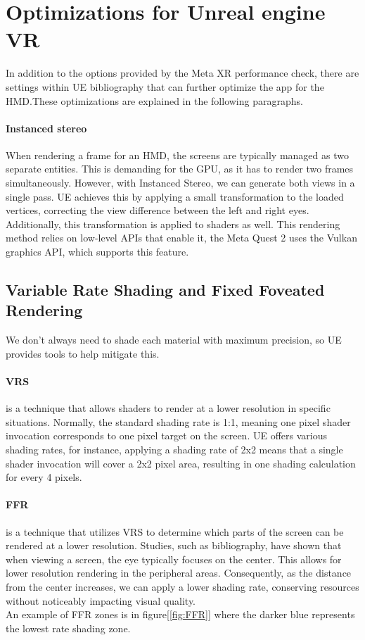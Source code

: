 \section{Optimizations for Unreal engine VR}
\noindent
In addition to the options provided by the Meta XR performance check, there are settings within \ac{UE} bibliography\cite{UEperformance} that can further optimize the app for the \ac{HMD}.These optimizations are explained in the following paragraphs.

\paragraph{Instanced stereo}
When rendering a frame for an \ac{HMD}, the screens are typically managed as two separate entities. This is demanding for the GPU, as it has to render two frames simultaneously.
However, with Instanced Stereo, we can generate both views in a single pass. \ac{UE} achieves this by applying a small transformation to the loaded vertices, correcting the view difference between the left and right eyes. Additionally, this transformation is applied to shaders as well.
This rendering method relies on low-level \ac{API}s that enable it, the Meta Quest 2 uses the Vulkan graphics \ac{API}, which supports this feature.

\subsection{Variable Rate Shading and Fixed Foveated Rendering}
\noindent
We don't always need to shade each material with maximum precision, so \ac{UE} provides tools to help mitigate this.

\paragraph{\ac{VRS}}
is a technique that allows shaders to render at a lower resolution in specific situations.
Normally, the standard shading rate is 1:1, meaning one pixel shader invocation corresponds to one pixel target on the screen.
\ac{UE} offers various shading rates, for instance, applying a shading rate of 2x2 means that a single shader invocation will cover a 2x2 pixel area, resulting in one shading calculation for every 4 pixels.

\paragraph{\ac{FFR}}
is a technique that utilizes \ac{VRS} to determine which parts of the screen can be rendered at a lower resolution.
Studies, such as bibliography\cite{eye}, have shown that when viewing a screen, the eye typically focuses on the center.
This allows for lower resolution rendering in the peripheral areas. Consequently, as the distance from the center increases, we can apply a lower shading rate, conserving resources without noticeably impacting visual quality.\\
An example of \ac{FFR} zones is in figure[\ref{fig:FFR}] where the darker blue represents the lowest rate shading zone.


